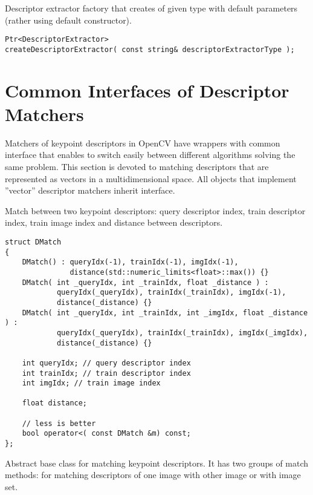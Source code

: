 Descriptor extractor factory that creates  of given type with 
default parameters (rather using default constructor).

\begin{lstlisting}
Ptr<DescriptorExtractor> 
createDescriptorExtractor( const string& descriptorExtractorType );
\end{lstlisting}

\begin{description}
\end{description}


\section{Common Interfaces of Descriptor Matchers}
Matchers of keypoint descriptors in OpenCV have wrappers with common interface that enables to switch easily 
between different algorithms solving the same problem. This section is devoted to matching descriptors 
that are represented as vectors in a multidimensional space. All objects that implement ''vector'' 
descriptor matchers inherit  interface.

Match between two keypoint descriptors: query descriptor index, 
train descriptor index, train image index and distance between descriptors.

\begin{lstlisting}
struct DMatch
{
    DMatch() : queryIdx(-1), trainIdx(-1), imgIdx(-1), 
               distance(std::numeric_limits<float>::max()) {}
    DMatch( int _queryIdx, int _trainIdx, float _distance ) :
            queryIdx(_queryIdx), trainIdx(_trainIdx), imgIdx(-1), 
            distance(_distance) {}
    DMatch( int _queryIdx, int _trainIdx, int _imgIdx, float _distance ) :
            queryIdx(_queryIdx), trainIdx(_trainIdx), imgIdx(_imgIdx), 
            distance(_distance) {}

    int queryIdx; // query descriptor index
    int trainIdx; // train descriptor index
    int imgIdx; // train image index

    float distance;

    // less is better
    bool operator<( const DMatch &m) const;
};
\end{lstlisting}

Abstract base class for matching keypoint descriptors. It has two groups 
of match methods: for matching descriptors of one image with other image or
with image set.

